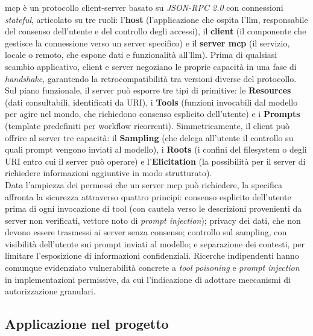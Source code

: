 \gls{mcp} è un protocollo client-server basato su \emph{JSON-RPC 2.0} con
connessioni \emph{stateful}, articolato su tre ruoli: l'\textbf{host}
(l'applicazione che ospita l'\gls{llm}, responsabile del consenso dell'utente
e del controllo degli accessi), il \textbf{client} (il componente che gestisce
la connessione verso un server specifico) e il \textbf{server \gls{mcp}} (il
servizio, locale o remoto, che espone dati e funzionalità all'\gls{llm}).
Prima di qualsiasi scambio applicativo, client e server negoziano le proprie
capacità in una fase di \emph{handshake}, garantendo la retrocompatibilità
tra versioni diverse del protocollo.\\
Sul piano funzionale, il server può esporre tre tipi di primitive: le
\textbf{Resources} (dati consultabili, identificati da URI), i \textbf{Tools}
(funzioni invocabili dal modello per agire nel mondo, che richiedono consenso
esplicito dell'utente) e i \textbf{Prompts} (template predefiniti per
workflow ricorrenti). Simmetricamente, il client può offrire al server tre
capacità: il \textbf{Sampling} (che delega all'utente il controllo su quali
prompt vengono inviati al modello), i \textbf{Roots} (i confini del filesystem
o degli URI entro cui il server può operare) e l'\textbf{Elicitation} (la
possibilità per il server di richiedere informazioni aggiuntive in modo
strutturato).\\
Data l'ampiezza dei permessi che un server \gls{mcp} può richiedere, la
specifica affronta la sicurezza attraverso quattro principi: consenso
esplicito dell'utente prima di ogni invocazione di tool (con cautela verso le
descrizioni provenienti da server non verificati, vettore noto di
\emph{prompt injection}); privacy dei dati, che non devono essere trasmessi
ai server senza consenso; controllo sul sampling, con visibilità
dell'utente sui prompt inviati al modello; e separazione dei contesti, per
limitare l'esposizione di informazioni confidenziali. Ricerche indipendenti
hanno comunque evidenziato vulnerabilità concrete a \emph{tool poisoning} e
\emph{prompt injection} in implementazioni permissive, da cui l'indicazione
di adottare meccanismi di autorizzazione granulari.

\subsection{Applicazione nel progetto}

